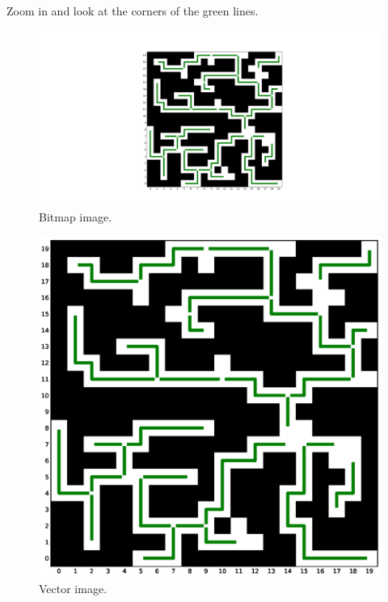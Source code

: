 \documentclass{article}
\begin{document}
Zoom in and look at the corners of the green lines.

\begin{figure}
    \includegraphics[width = 0.99 \linewidth]{bitmap-image.png}
    \caption{Bitmap image.}
\end{figure}

\begin{figure}
    \includegraphics[width = 0.99 \linewidth]{vector-image.eps}
    \caption{Vector image.}
\end{figure}
\end{document}
